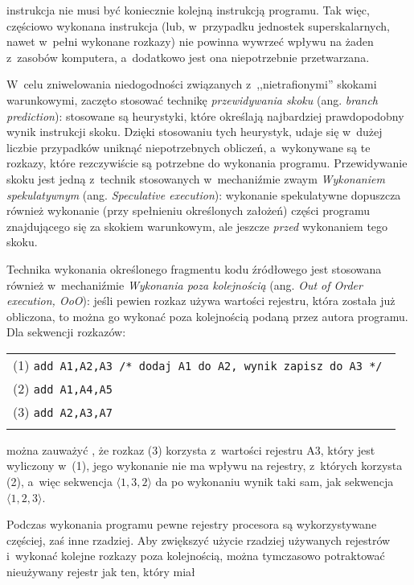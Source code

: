 \documentclass{mwart}
\begin{document}
	instrukcja nie musi być koniecznie kolejną instrukcją programu. Tak więc, częściowo wykonana instrukcja (lub, w~przypadku jednostek
	superskalarnych, nawet w~pełni wykonane rozkazy) nie powinna wywrzeć wpływu na żaden z~zasobów komputera, 
	a~dodatkowo jest ona niepotrzebnie przetwarzana.
\par
%
\indent
	W~celu zniwelowania niedogodności związanych z~,,nietrafionymi'' skokami warunkowymi, zaczęto stosować technikę 
	\emph{przewidywania skoku} (ang. \emph{branch prediction}): stosowane są heurystyki, które określają najbardziej prawdopodobny
	wynik instrukcji skoku. Dzięki stosowaniu tych heurystyk, udaje się w~dużej liczbie przypadków uniknąć niepotrzebnych obliczeń,
	a~wykonywane są te rozkazy, które rezczywiście są potrzebne do wykonania programu.
	Przewidywanie skoku jest jedną z~technik stosowanych w~mechaniźmie zwaym \emph{Wykonaniem spekulatywnym} (ang. \emph{Speculative execution}):
	wykonanie spekulatywne dopuszcza również wykonanie (przy spełnieniu określonych założeń) części programu znajdującego się za skokiem warunkowym,
	ale jeszcze \emph{przed} wykonaniem tego skoku.
\par
%
\indent
	Technika wykonania określonego fragmentu kodu źródłowego jest stosowana również w~mechaniźmie \emph{Wykonania poza kolejnością}
	(ang. \emph{Out of Order execution, OoO}): jeśli pewien rozkaz używa wartości rejestru, która została już obliczona, to można go wykonać
	poza kolejnością podaną przez autora programu. Dla sekwencji rozkazów:
	\begin{flushleft}
	\begin{tabular}{l}\\
		(1) {\tt add A1,A2,A3 /* dodaj A1 do A2, wynik zapisz do A3 */ } \\
		(2) {\tt add A1,A4,A5 } \\
		(3) {\tt add A2,A3,A7 } \\
		\\
	\end{tabular}
	\end{flushleft}
	można zauważyć , że rozkaz (3) korzysta z~wartości rejestru A3, który jest wyliczony w~(1), jego wykonanie nie ma wpływu na rejestry, z~których 
	korzysta (2), a~więc sekwencja $\langle 1, 3, 2 \rangle $ da po wykonaniu wynik taki sam, jak sekwencja $\langle 1, 2, 3 \rangle $.
\par
%
\indent
	Podczas wykonania programu pewne rejestry procesora są wykorzystywane częściej, zaś inne rzadziej. Aby zwiększyć użycie rzadziej
	używanych rejestrów i~wykonać kolejne rozkazy poza kolejnością, można tymczasowo potraktować nieużywany rejestr jak ten, który miał
\end{document}

